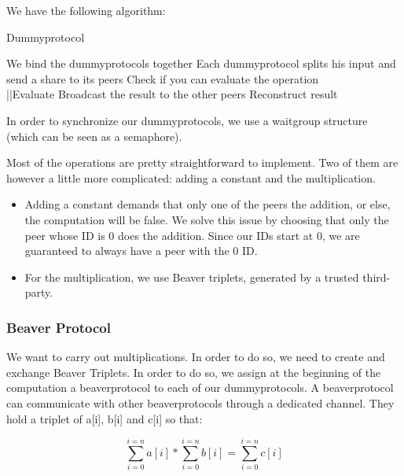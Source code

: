 \documentclass[10pt,conference,compsocconf]{IEEEtran}
\begin{document}
We have the following algorithm:

\begin{algorithm}
	\caption{Dummyprotocol}\label{hard-core bit}
	\begin{algorithmic}[1]
		\State We bind the dummyprotocols together
		\State Each dummyprotocol splits his input and send a share to its peers
		\State Check if you can evaluate the operation
		\\{ ||Evaluate}
		\EndIf
		\EndFor
		\State Broadcast the result to the other peers
		\State Reconstruct result
	\end{algorithmic}
\end{algorithm}

In order to synchronize our dummyprotocols, we use a waitgroup structure (which can be seen as a semaphore).

Most of the operations are pretty straightforward to implement. Two of them are however a little more complicated: adding a constant and the multiplication.\\

\begin{itemize}
    \item Adding a constant demands that only one of the peers the addition, or else, the computation will be false. We solve this issue by choosing that only the peer whose ID is 0 does the addition. Since our IDs start at 0, we are guaranteed to always have a peer with the 0 ID.
    \item For the multiplication, we use Beaver triplets, generated by a trusted third-party.
\end{itemize}

\subsubsection{Beaver Protocol}

We want to carry out multiplications. In order to do so, we need to create and exchange Beaver Triplets. In order to do so, we assign at the beginning of the computation a beaverprotocol to each of our dummyprotocols. A beaverprotocol can communicate with other beaverprotocols through a dedicated channel. They hold a triplet of a[i], b[i] and c[i] so that:

\begin{equation*}
\sum_{i=0}^{i=n}a[i] * \sum_{i=0}^{i=n}b[i] = \sum_{i=0}^{i=n}c[i]
\end{equation*}
\end{document}
